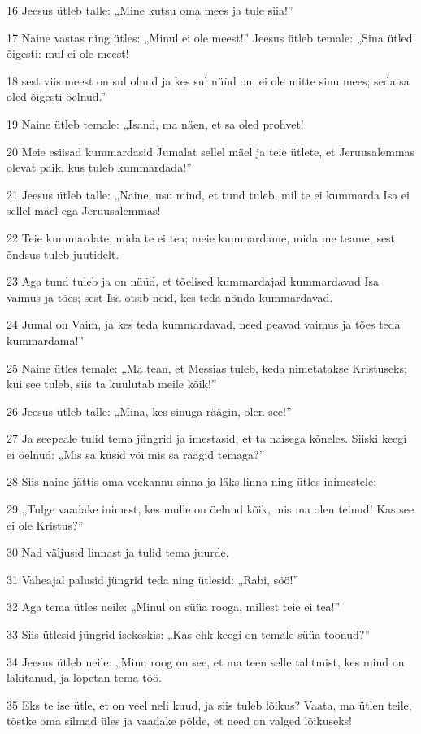 \par 16 Jeesus ütleb talle: „Mine kutsu oma mees ja tule siia!”
\par 17 Naine vastas ning ütles: „Minul ei ole meest!” Jeesus ütleb temale: „Sina ütled õigesti: mul ei ole meest!
\par 18 sest viis meest on sul olnud ja kes sul nüüd on, ei ole mitte sinu mees; seda sa oled õigesti öelnud.”
\par 19 Naine ütleb temale: „Isand, ma näen, et sa oled prohvet!
\par 20 Meie esiisad kummardasid Jumalat sellel mäel ja teie ütlete, et Jeruusalemmas olevat paik, kus tuleb kummardada!”
\par 21 Jeesus ütleb talle: „Naine, usu mind, et tund tuleb, mil te ei kummarda Isa ei sellel mäel ega Jeruusalemmas!
\par 22 Teie kummardate, mida te ei tea; meie kummardame, mida me teame, sest õndsus tuleb juutidelt.
\par 23 Aga tund tuleb ja on nüüd, et tõelised kummardajad kummardavad Isa vaimus ja tões; sest Isa otsib neid, kes teda nõnda kummardavad.
\par 24 Jumal on Vaim, ja kes teda kummardavad, need peavad vaimus ja tões teda kummardama!”
\par 25 Naine ütles temale: „Ma tean, et Messias tuleb, keda nimetatakse Kristuseks; kui see tuleb, siis ta kuulutab meile kõik!”
\par 26 Jeesus ütleb talle: „Mina, kes sinuga räägin, olen see!”
\par 27 Ja seepeale tulid tema jüngrid ja imestasid, et ta naisega kõneles. Siiski keegi ei öelnud: „Mis sa küsid või mis sa räägid temaga?”
\par 28 Siis naine jättis oma veekannu sinna ja läks linna ning ütles inimestele:
\par 29 „Tulge vaadake inimest, kes mulle on öelnud kõik, mis ma olen teinud! Kas see ei ole Kristus?”
\par 30 Nad väljusid linnast ja tulid tema juurde.
\par 31 Vaheajal palusid jüngrid teda ning ütlesid: „Rabi, söö!”
\par 32 Aga tema ütles neile: „Minul on süüa rooga, millest teie ei tea!”
\par 33 Siis ütlesid jüngrid isekeskis: „Kas ehk keegi on temale süüa toonud?”
\par 34 Jeesus ütleb neile: „Minu roog on see, et ma teen selle tahtmist, kes mind on läkitanud, ja lõpetan tema töö.
\par 35 Eks te ise ütle, et on veel neli kuud, ja siis tuleb lõikus? Vaata, ma ütlen teile, tõstke oma silmad üles ja vaadake põlde, et need on valged lõikuseks!
